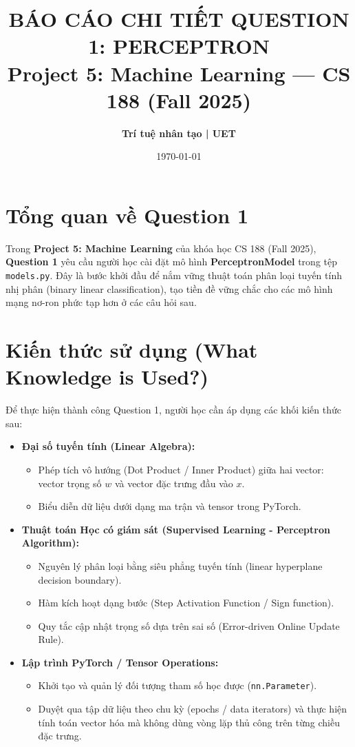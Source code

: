 \documentclass[11pt, a4paper]{article}
\title{\textbf{\Large BÁO CÁO CHI TIẾT QUESTION 1: PERCEPTRON}\\[0.3em]
\large Project 5: Machine Learning --- CS 188 (Fall 2025)}
\author{\textbf{Trí tuệ nhân tạo | UET}}
\date{\today}
\begin{document}
\maketitle

\section{Tổng quan về Question 1}
Trong \textbf{Project 5: Machine Learning} của khóa học CS 188 (Fall 2025), \textbf{Question 1} yêu cầu người học cài đặt mô hình \textbf{PerceptronModel} trong tệp \texttt{models.py}. Đây là bước khởi đầu để nắm vững thuật toán phân loại tuyến tính nhị phân (binary linear classification), tạo tiền đề vững chắc cho các mô hình mạng nơ-ron phức tạp hơn ở các câu hỏi sau.

\section{Kiến thức sử dụng (What Knowledge is Used?)}
Để thực hiện thành công Question 1, người học cần áp dụng các khối kiến thức sau:
\begin{itemize}[itemsep=4pt]
    \item \textbf{Đại số tuyến tính (Linear Algebra):}
    \begin{itemize}
        \item Phép tích vô hướng (Dot Product / Inner Product) giữa hai vector: vector trọng số $w$ và vector đặc trưng đầu vào $x$.
        \item Biểu diễn dữ liệu dưới dạng ma trận và tensor trong PyTorch.
    \end{itemize}
    \item \textbf{Thuật toán Học có giám sát (Supervised Learning - Perceptron Algorithm):}
    \begin{itemize}
        \item Nguyên lý phân loại bằng siêu phẳng tuyến tính (linear hyperplane decision boundary).
        \item Hàm kích hoạt dạng bước (Step Activation Function / Sign function).
        \item Quy tắc cập nhật trọng số dựa trên sai số (Error-driven Online Update Rule).
    \end{itemize}
    \item \textbf{Lập trình PyTorch / Tensor Operations:}
    \begin{itemize}
        \item Khởi tạo và quản lý đối tượng tham số học được (\texttt{nn.Parameter}).
        \item Duyệt qua tập dữ liệu theo chu kỳ (epochs / data iterators) và thực hiện tính toán vector hóa mà không dùng vòng lặp thủ công trên từng chiều đặc trưng.
    \end{itemize}
\end{itemize}
\end{document}
